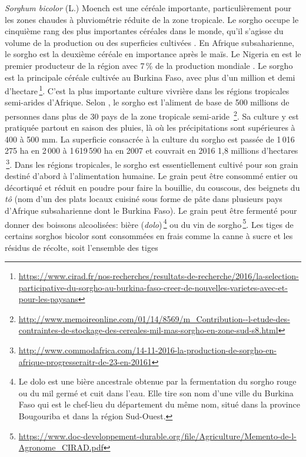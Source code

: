 \documentclass[a4paper,11pt]{article}
\begin{document}
\emph{Sorghum bicolor} (L.) Moench est une céréale importante,
particulièrement pour les zones chaudes à pluviométrie réduite de la
zone tropicale. Le sorgho occupe le cinquième rang des plus
importantes céréales dans le monde, qu'il s'agisse du volume de la
production ou des superficies cultivées \cite{FAOICRISAT_1997}. En
Afrique subsaharienne, le sorgho est la deuxième céréale en importance
après le maïs. Le Nigeria en est le premier producteur de la région
avec 7\,\% de la production mondiale \cite{FAO_1995}. Le sorgho est la
principale céréale cultivée au Burkina Faso, avec plus d'un million et
demi
d'hectare\,\footnote{\url{https://www.cirad.fr/nos-recherches/resultats-de-recherche/2016/la-selection-participative-du-sorgho-au-burkina-faso-creer-de-nouvelles-varietes-avec-et-pour-les-paysans}}. C'est
la plus importante culture vivrière dans les régions tropicales
semi-arides d'Afrique. Selon , le sorgho est
l'aliment de base de 500 millions de personnes dans plus de 30 pays de
la zone tropicale semi-aride
\,\footnote{\url{http://www.memoireonline.com/01/14/8569/m_Contribution--l-etude-des-contraintes-de-stockage-des-cereales-mil-mas-sorgho-en-zone-sud-s8.html}}.
Sa culture y est pratiquée partout en saison des pluies, là où les
précipitations sont supérieures à 400 à 500 mm. La superficie
consacrée à la culture du sorgho est passée de 1\,016\,275 ha en
2\,000 à 1\,619\,590 ha en 2007 \cite{FAO_2007} et couvrait en 2016
1,8 millions d'hectares
\,\footnote{\url{http://www.commodafrica.com/14-11-2016-la-production-de-sorgho-en-afrique-progresseraitr-de-23-en-20161}}. Dans
les régions tropicales, le sorgho est essentiellement cultivé pour son
grain destiné d'abord à l'alimentation humaine. Le grain peut être
consommé entier ou décortiqué et réduit en poudre pour faire la
bouillie, du couscous, des beignets du \emph{tô} (nom d'un des plats
locaux cuisiné sous forme de pâte dans plusieurs pays d'Afrique
subsaharienne dont le Burkina Faso). Le grain peut être fermenté pour
donner des boissons alcoolisées: bière (\emph{dolo})\,\footnote{Le
  dolo est une bière ancestrale obtenue par la fermentation du sorgho
  rouge ou du mil germé et cuit dans l'eau. Elle tire son nom d'une
  ville du Burkina Faso qui est le chef-lieu du département du même
  nom, situé dans la province Bougouriba et dans la région Sud-Ouest.}
ou du vin de
sorgho\,\footnote{\url{https://www.doc-developpement-durable.org/file/Agriculture/Memento-de-l-Agronome_CIRAD.pdf}}.
Les tiges de certains sorghos bicolor sont consommées en frais comme
la canne à sucre et les résidus de récolte, soit l'ensemble des tiges
\end{document}
